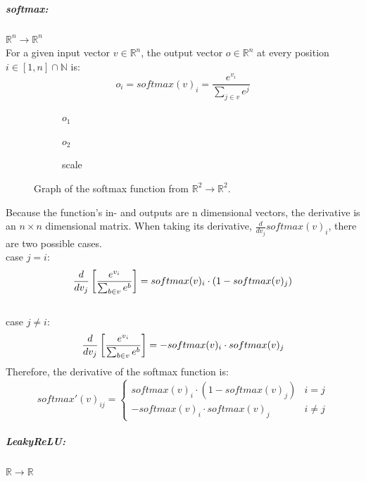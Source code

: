 \documentclass[12pt]{article}
\begin{document}
\subparagraph*{softmax:} \(\mathbb{R}^n\to \mathbb{R}^n\)\\
\indent For a given input vector \(v \in \mathbb{R}^n\), the output vector \(o \in \mathbb{R}^n\) at every position \(i \in [1, n]\cap\mathbb N\) is:
\begin{equation} \label{eq:NN:softmax}
o_i = softmax(v)_i = \frac{e^{v_i}}{\sum_{j \in v} e^j}
\end{equation}
\begin{figure}[H]
\centering
\begin{subfigure}{.4\textwidth}
  \centering
  
  \caption{\(o_1\)}
  \label{fig:sub1}
\end{subfigure}%
\begin{subfigure}{.4\textwidth}
  \centering
  
  \caption{\(o_2\)}
  \label{fig:sub2}
\end{subfigure}
\begin{subfigure}{.1\textwidth}
  \centering
  
  \caption*{scale}
\end{subfigure}
\caption{Graph of the softmax function from \(\mathbb R^2 \to \mathbb R^2\).}
\label{fig:test}
\end{figure}

Because the function's in- and outputs are n dimensional vectors, the derivative is an \(n\times n\) dimensional matrix. When taking its derivative, \(\frac{d}{dv_j}softmax(v)_i\), there are two possible cases. 
\\\indent case \(j = i\):
\begin{equation}
\frac{d}{dv_j}\left[\frac{e^{v_i}}{\sum_{b\in v} e^{b}}\right] = softmax(v)_i\cdot (1 - softmax(v)_j)\\
\end{equation}
\\\indent case \(j \neq i\):
\begin{equation}
\frac{d}{dv_j}\left[\frac{e^{v_i}}{\sum_{b\in v} e^{b}}\right] = -softmax(v)_i\cdot softmax(v)_j \\
\end{equation}
Therefore, the derivative of the softmax function is:
\begin{equation}\label{eq:NN:softmax_derivative}
softmax'(v)_{ij} = \left\{
\begin{array}{ll}
 softmax(v)_i\cdot (1-softmax(v)_j) & i = j\\
 - softmax(v)_i \cdot softmax(v)_j     & i \neq j
\end{array}
\right.
\end{equation}
\subparagraph*{LeakyReLU:}\(\mathbb{R} \to \mathbb{R}\)
\begin{center}

\end{center}
\end{document}

